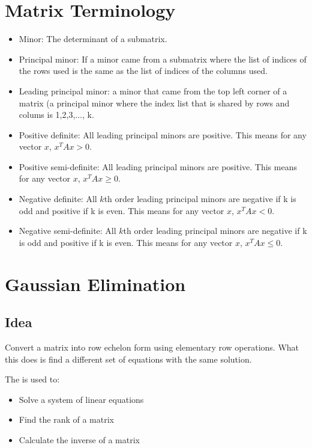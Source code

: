 \documentclass[12pt]{article}
\begin{document}
\section{Matrix Terminology}
\begin{itemize}
\item Minor: The determinant of a submatrix.

\item Principal minor: If a minor came from a submatrix where the list of indices of the rows used is the same as the list of indices of the columns used.

\item Leading principal minor: a minor that came from the top left corner of a matrix (a principal minor where the index list that is shared by rows and colums is {1,2,3,..., k}.

\item Positive definite: All leading principal minors are positive. This means for any vector $x$, $x^T A x > 0$.

\item Positive semi-definite: All leading principal minors are positive. This means for any vector $x$, $x^T A x \geq 0$.

\item Negative definite: All $k$th order leading principal minors are negative if k is odd and positive if k is even. This means for any vector $x$, $x^T A x < 0$.

\item Negative semi-definite: All $k$th order leading principal minors are negative if k is odd and positive if k is even. This means for any vector $x$, $x^T A x \leq 0$.

\end{itemize}

\section{Gaussian Elimination}
\subsection{Idea}
Convert a matrix into row echelon form using elementary row operations. What this does is find a different set of equations with the same solution.

The is used to:

\begin{itemize}
\item Solve a system of linear equations
\item Find the rank of a matrix
\item Calculate the inverse of a matrix
\end{itemize}
\end{document}
